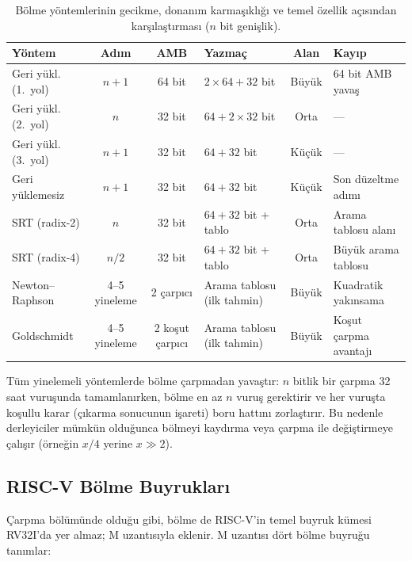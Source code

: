 \begin{table}[htbp]
\centering
\caption[Bölme yöntemlerinin karşılaştırması]{Bölme yöntemlerinin gecikme, donanım karmaşıklığı ve temel özellik açısından karşılaştırması ($n$ bit genişlik).}
\label{tab:bolme-yol-karsilastirma}
\footnotesize
\begin{tabularx}{\textwidth}{l c c l c X}
\toprule
\textbf{Yöntem} & \textbf{Adım} & \textbf{AMB} & \textbf{Yazmaç} & \textbf{Alan} & \textbf{Kayıp} \\
\midrule
Geri yükl. (1.\ yol) & $n{+}1$ & 64 bit & $2{\times}64 + 32$ bit & Büyük & 64 bit AMB yavaş \\
Geri yükl. (2.\ yol) & $n$ & 32 bit & $64 + 2{\times}32$ bit & Orta & --- \\
Geri yükl. (3.\ yol) & $n{+}1$ & 32 bit & $64 + 32$ bit & Küçük & --- \\
Geri yüklemesiz & $n{+}1$ & 32 bit & $64 + 32$ bit & Küçük & Son düzeltme adımı \\
SRT (radix-2) & $n$ & 32 bit & $64 + 32$ bit + tablo & Orta & Arama tablosu alanı \\
SRT (radix-4) & $n/2$ & 32 bit & $64 + 32$ bit + tablo & Orta & Büyük arama tablosu \\
\midrule
Newton--Raphson & 4--5 yineleme & 2 çarpıcı & Arama tablosu (ilk tahmin) & Büyük & Kuadratik yakınsama \\
Goldschmidt & 4--5 yineleme & 2 koşut çarpıcı & Arama tablosu (ilk tahmin) & Büyük & Koşut çarpma avantajı \\
\bottomrule
\end{tabularx}
\end{table}

Tüm yinelemeli yöntemlerde bölme çarpmadan yavaştır: $n$ bitlik bir çarpma 32 saat vuruşunda tamamlanırken, bölme en az $n$ vuruş gerektirir ve her vuruşta koşullu karar (çıkarma sonucunun işareti) boru hattını zorlaştırır. Bu nedenle derleyiciler mümkün olduğunca bölmeyi kaydırma veya çarpma ile değiştirmeye çalışır (örneğin $x / 4$ yerine $x \gg 2$).


\subsection{RISC-V Bölme Buyrukları}
\label{sec:riscv-bolme-buyruklar}

Çarpma bölümünde olduğu gibi, bölme de RISC-V'in temel buyruk kümesi RV32I'da yer almaz; M uzantısıyla eklenir. M uzantısı dört bölme buyruğu tanımlar:

